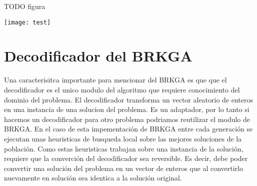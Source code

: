 TODO figura

\texttt{[image: test]}

\section{Decodificador del BRKGA}

Una caracterisitca importante para mencionar del BRKGA es que que el decodificador es el unico modulo del algoritmo que requiere conocimiento del dominio del problema. El decodificador transforma un vector aleatorio de enteros en una instancia de una solucion del problema. Es un adaptador, por lo tanto si hacemos un decodificador para otro problema podriamos reutilizar el modulo de BRKGA.
En el caso de esta impementación de BRKGA entre cada generación se ejecutan unas heuristicas de busqueda local sobre las mejores soluciones de la población. Como estas heuristicas trabajan sobre una instancia de la solución, requiere que la converción del decodificador sea reversible. Es decir, debe poder convertir una solución del problema en un vector de enteros que al convertirlo nuevamente en solución sea identica a la solución original. 

